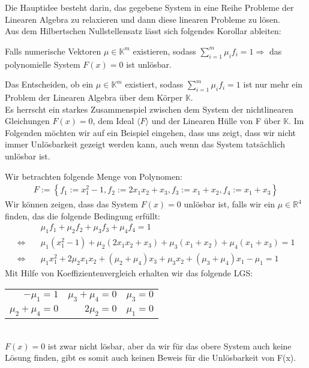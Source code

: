 Die Hauptidee besteht darin, das gegebene System in eine Reihe Probleme der Linearen Algebra zu relaxieren und dann diese linearen Probleme zu lösen. \\
Aus dem Hilbertschen Nullstellensatz lässt sich folgendes Korollar ableiten: 
\begin{corollary}
Falls numerische Vektoren $\mu \in \mathbb{K}^m$ existieren, sodass $\sum_{i=1}^m \mu_i f_i = 1 \Rightarrow $ das polynomielle System $F(x) = 0$ ist unlösbar. 
\end{corollary}
\noindent Das Entscheiden, ob ein $\mu \in \mathbb{K}^m$ existiert, sodass $\sum_{i=1}^m \mu_i f_i = 1$ ist nur mehr ein Problem der Linearen Algebra über dem Körper $\mathbb{K}$. \\
Es herrscht ein starkes Zusammenspiel zwischen dem System der nichtlinearen Gleichungen $F(x) = 0$, dem Ideal $\langle F \rangle$ und der Linearen Hülle von F über $\mathbb{K}$. 
\noindent Im Folgenden möchten wir auf ein Beispiel eingehen, dass uns zeigt, dass wir nicht immer Unlösbarkeit gezeigt werden kann, auch wenn das System tatsächlich unlösbar ist.
\begin{example} \label{ex1}
Wir betrachten folgende Menge von Polynomen:
\begin{align*}
F := \left\{f_1 := x_1^2-1, f_2 := 2x_1x_2+x_3,f_3:=x_1+x_2,f_4:=x_1+x_3 \right\}
\end{align*}
Wir können zeigen, dass das System $F(x)=0$ unlösbar ist, falls wir ein $\mu \in \mathbb{R}^4$ finden, das die folgende Bedingung erfüllt:
\begin{align*}
&\mu_1 f_1 + \mu_2 f_2 + \mu_3 f_3 + \mu_4 f_4 = 1 \\
\Leftrightarrow \quad &\mu_1(x_1^2-1)+\mu_2(2x_1x_2+x_3)+\mu_3(x_1+x_2)+\mu_4(x_1+x_3)=1 \\
\Leftrightarrow \quad &\mu_1x_1^2+2\mu_2x_1x_2+(\mu_2+\mu_4)x_3+\mu_3x_2+(\mu_3+\mu_4)x_1-\mu_1 = 1
\end{align*}
Mit Hilfe von Koeffizientenvergleich erhalten wir das folgende LGS:
\begin{table}[h]
\begin{center}
\begin{tabular}{rrr}
$-\mu_1=1$ & $\mu_3+\mu_4=0$ & $\mu_3=0$ \\
$\mu_2+\mu_4=0$ & $2\mu_2=0$ & $\mu_1=0$ 
\end{tabular}
\end{center}
\end{table}
\\
$F(x)= 0$ ist zwar nicht lösbar, aber da wir für das obere System auch keine Lösung finden, gibt es somit auch keinen Beweis für die Unlösbarkeit von F(x).

\end{example}

